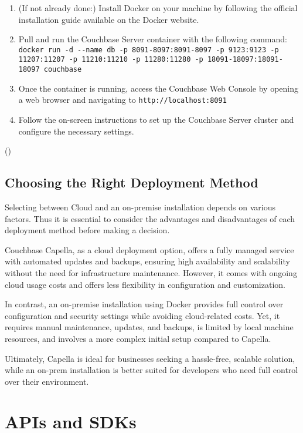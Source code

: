 \begin{enumerate}
  \item (If not already done:) Install Docker on your machine by following the official installation guide available on the Docker website.
  \item Pull and run the Couchbase Server container with the following command: \\
  \lstinline|docker run -d --name db -p 8091-8097:8091-8097 -p 9123:9123 -p 11207:11207 -p 11210:11210 -p 11280:11280 -p 18091-18097:18091-18097 couchbase| 
  \item Once the container is running, access the Couchbase Web Console by opening a web browser and navigating to \lstinline|http://localhost:8091|
  \item Follow the on-screen instructions to set up the Couchbase Server cluster and configure the necessary settings.
\end{enumerate}
(\cite{couchbaseDocker})

\section{Choosing the Right Deployment Method}
Selecting between Cloud and an on-premise installation depends on various factors. Thus it is essential to consider the advantages and disadvantages of each deployment method before making a decision.

Couchbase Capella, as a cloud deployment option, offers a fully managed service with automated updates and backups, ensuring high availability and scalability without the need for infrastructure maintenance. However, it comes with ongoing cloud usage costs and offers less flexibility in configuration and customization. 

In contrast, an on-premise installation using Docker provides full control over configuration and security settings while avoiding cloud-related costs. Yet, it requires manual maintenance, updates, and backups, is limited by local machine resources, and involves a more complex initial setup compared to Capella. 

Ultimately, Capella is ideal for businesses seeking a hassle-free, scalable solution, while an on-prem installation is better suited for developers who need full control over their environment.









\chapter{APIs and SDKs}


